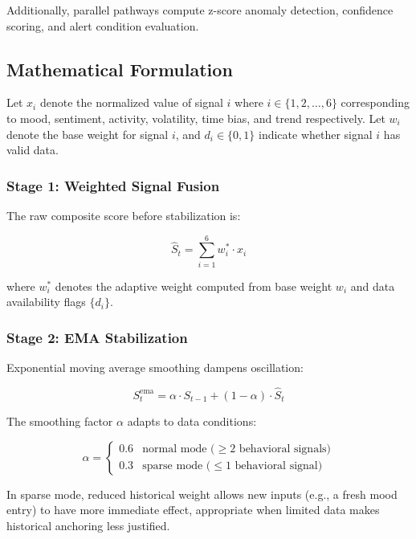 \documentclass[journal]{IEEEtran}
\begin{document}
Additionally, parallel pathways compute z-score anomaly detection, confidence scoring, and alert condition evaluation.

\subsection{Mathematical Formulation}

Let $x_i$ denote the normalized value of signal $i$ where $i \in \{1, 2, \ldots, 6\}$ corresponding to mood, sentiment, activity, volatility, time bias, and trend respectively. Let $w_i$ denote the base weight for signal $i$, and $d_i \in \{0, 1\}$ indicate whether signal $i$ has valid data.

\subsubsection{Stage 1: Weighted Signal Fusion}

The raw composite score before stabilization is:

\begin{equation}
\hat{S}_t = \sum_{i=1}^{6} w_i^{*} \cdot x_i
\end{equation}

where $w_i^{*}$ denotes the adaptive weight computed from base weight $w_i$ and data availability flags $\{d_i\}$.

\subsubsection{Stage 2: EMA Stabilization}

Exponential moving average smoothing dampens oscillation:

\begin{equation}
S_t^{\text{ema}} = \alpha \cdot S_{t-1} + (1 - \alpha) \cdot \hat{S}_t
\end{equation}

The smoothing factor $\alpha$ adapts to data conditions:

\begin{equation}
\alpha = \begin{cases}
0.6 & \text{normal mode (}\geq 2 \text{ behavioral signals)} \\
0.3 & \text{sparse mode (}\leq 1 \text{ behavioral signal)}
\end{cases}
\end{equation}

In sparse mode, reduced historical weight allows new inputs (e.g., a fresh mood entry) to have more immediate effect, appropriate when limited data makes historical anchoring less justified.
\end{document}
